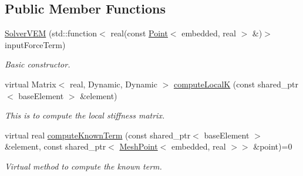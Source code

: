\subsection*{Public Member Functions}
\begin{DoxyCompactItemize}
\item 
\hyperlink{class_solver_v_e_m_ae0eca27b7af4c0877c0abe2cfbcfdcae}{Solver\+V\+EM} (std\+::function$<$ real(const \hyperlink{class_point}{Point}$<$ embedded, real $>$ \&)$>$ input\+Force\+Term)
\begin{DoxyCompactList}\small\item\em Basic constructor. \end{DoxyCompactList}\item 
virtual Matrix$<$ real, Dynamic, Dynamic $>$ \hyperlink{class_solver_v_e_m_acdbd3c97184fbd831b2f21e28148c33e}{compute\+LocalK} (const shared\+\_\+ptr$<$ base\+Element $>$ \&element)\hypertarget{class_solver_v_e_m_acdbd3c97184fbd831b2f21e28148c33e}{}\label{class_solver_v_e_m_acdbd3c97184fbd831b2f21e28148c33e}

\begin{DoxyCompactList}\small\item\em This is to compute the local stiffness matrix. \end{DoxyCompactList}\item 
virtual real \hyperlink{class_solver_v_e_m_af5b39e79f497fb28f63592c44120d5fe}{compute\+Known\+Term} (const shared\+\_\+ptr$<$ base\+Element $>$ \&element, const shared\+\_\+ptr$<$ \hyperlink{class_mesh_point}{Mesh\+Point}$<$ embedded, real $>$$>$ \&point)=0\hypertarget{class_solver_v_e_m_af5b39e79f497fb28f63592c44120d5fe}{}\label{class_solver_v_e_m_af5b39e79f497fb28f63592c44120d5fe}

\begin{DoxyCompactList}\small\item\em Virtual method to compute the known term. \end{DoxyCompactList}\end{DoxyCompactItemize}
